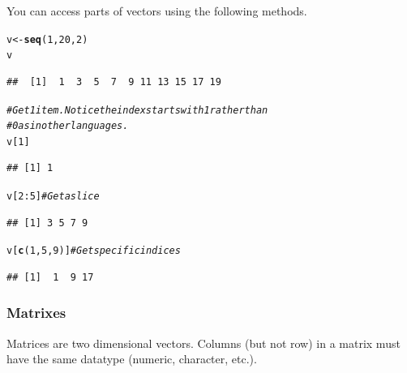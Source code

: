 \documentclass[draft]{article}\usepackage[]{graphicx}\usepackage[]{color}
\makeatletter
\newcommand{\hlnum}[1]{\textcolor[rgb]{0.686,0.059,0.569}{#1}}%
\newcommand{\hlcom}[1]{\textcolor[rgb]{0.678,0.584,0.686}{\textit{#1}}}%
\newcommand{\hlopt}[1]{\textcolor[rgb]{0,0,0}{#1}}%
\newcommand{\hlstd}[1]{\textcolor[rgb]{0.345,0.345,0.345}{#1}}%
\newcommand{\hlkwb}[1]{\textcolor[rgb]{0.69,0.353,0.396}{#1}}%
\newcommand{\hlkwd}[1]{\textcolor[rgb]{0.737,0.353,0.396}{\textbf{#1}}}%
\newenvironment{kframe}{%
 \def\at@end@of@kframe{}%
 \ifinner\ifhmode%
  \def\at@end@of@kframe{\end{minipage}}%
  \begin{minipage}{\columnwidth}%
 \fi\fi%
 \def\FrameCommand##1{\hskip\@totalleftmargin \hskip-\fboxsep
 \colorbox{shadecolor}{##1}\hskip-\fboxsep
     \hskip-\linewidth \hskip-\@totalleftmargin \hskip\columnwidth}%
 \MakeFramed {\advance\hsize-\width
   \@totalleftmargin\z@ \linewidth\hsize
   \@setminipage}}%
 {\par\unskip\endMakeFramed%
 \at@end@of@kframe}
\newenvironment{knitrout}{}{} %
\makeatother
\begin{document}
    You can access parts of vectors using the following methods.
    
\begin{knitrout}
\color{fgcolor}\begin{kframe}
\begin{alltt}
  \hlstd{v} \hlkwb{<-} \hlkwd{seq}\hlstd{(}\hlnum{1}\hlstd{,} \hlnum{20}\hlstd{,} \hlnum{2}\hlstd{)}
  \hlstd{v}
\end{alltt}
\begin{verbatim}
##  [1]  1  3  5  7  9 11 13 15 17 19
\end{verbatim}
\begin{alltt}
  \hlcom{# Get 1 item. Notice the index starts with 1 rather than}
  \hlcom{# 0 as in other languages.}
  \hlstd{v[}\hlnum{1}\hlstd{]}
\end{alltt}
\begin{verbatim}
## [1] 1
\end{verbatim}
\begin{alltt}
  \hlstd{v[}\hlnum{2}\hlopt{:}\hlnum{5}\hlstd{]}  \hlcom{# Get a slice}
\end{alltt}
\begin{verbatim}
## [1] 3 5 7 9
\end{verbatim}
\begin{alltt}
  \hlstd{v[}\hlkwd{c}\hlstd{(}\hlnum{1}\hlstd{,} \hlnum{5}\hlstd{,} \hlnum{9}\hlstd{)]}  \hlcom{# Get specific indices}
\end{alltt}
\begin{verbatim}
## [1]  1  9 17
\end{verbatim}
\end{kframe}
\end{knitrout}
    
    \subsubsection*{Matrixes}
    Matrices are two dimensional vectors. Columns (but not row) in a matrix must have the same datatype (numeric, character, etc.).
    
\end{document}
